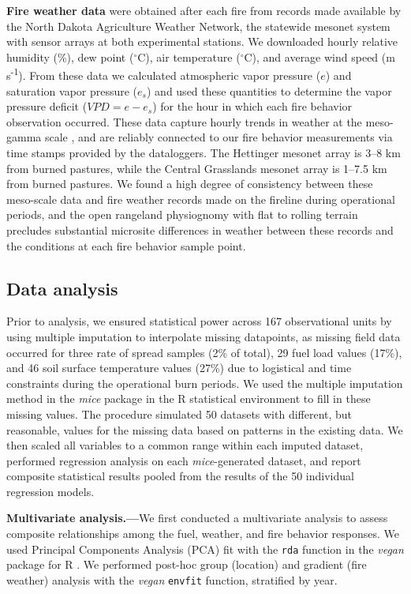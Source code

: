 \documentclass[referee, 
		     sn-basic]{sn-jnl}
\newcommand{\degC}{$^\circ$C}
\begin{document}
\begin{linenumbers}
\textbf{Fire weather data} were obtained after each fire from records
made available by the North Dakota Agriculture Weather Network, the
statewide mesonet system with sensor arrays at both experimental
stations. We downloaded hourly relative humidity (\%), dew point
(\degC), air temperature (\degC), and average wind speed (m s\textsuperscript{-1}). From these data we calculated atmospheric vapor pressure ($e$) and saturation vapor pressure ($e_s$) and used these
quantities to determine the vapor pressure deficit ($VPD = e - e_s$)
for the hour in which each fire behavior observation occurred. These
data capture hourly trends in weather at the meso-gamma scale \citep[2-20 km;][]{orlanski1975}, and are reliably connected to our fire behavior measurements via time stamps provided by the dataloggers. 
The Hettinger mesonet array is 3--8 km from burned pastures, while the Central Grasslands mesonet array is 1--7.5 km from burned pastures. We
found a high degree of consistency between these meso-scale data and
fire weather records made on the fireline during operational periods,
and the open rangeland physiognomy with flat to rolling terrain
precludes substantial microsite differences in weather between these
records and the conditions at each fire behavior sample point.

\hypertarget{data-analysis}{%
\subsection{Data analysis}\label{data-analysis}}

Prior to analysis, we ensured statistical power across 167 observational
units by using multiple imputation to interpolate missing datapoints, as
missing field data occurred for three rate of spread samples (2\% of
total), 29 fuel load values (17\%), and 46 soil surface temperature
values (27\%) due to logistical and time constraints during the
operational burn periods. We used the multiple imputation method in the
\emph{mice} package \citep{vanbuuren2011} in the \textsf{R} statistical environment \citep{rct2020} to fill in these missing values. 
The procedure simulated 50 datasets with different, but reasonable, values for the missing data based on patterns in the existing data. 
We then scaled all variables to a common range within each imputed dataset, performed regression analysis on each \emph{mice}-generated dataset, and report composite statistical results pooled from the results of the 50 individual regression models.

\textbf{Multivariate analysis.---}We first conducted a multivariate analysis to assess composite relationships among the fuel, weather, and fire behavior responses. 
We used Principal Components Analysis (PCA) fit with the \texttt{rda} function in the \emph{vegan} package for \textsf{R} \citep{oksanen2017}. 
We performed post-hoc group (location) and gradient (fire weather) analysis with the \emph{vegan} \texttt{envfit} function, stratified by year.


\end{linenumbers}
\end{document}
